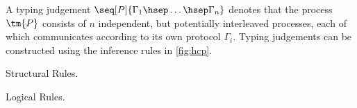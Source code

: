 \begin{definition}\label{def:hcp-typing}
  A typing judgement $\seq[P]{\Gamma_1 \hsep \dots \hsep \Gamma_n}$ denotes
  that the process $\tm{P}$ consists of $n$ independent, but potentially
  interleaved processes, each of which communicates according to its own
  protocol $\Gamma_i$. 
  Typing judgements can be constructed using the inference rules in
  \cref{fig:hcp}.
\end{definition}
\begin{figure*}[!htb]
  Structural Rules.
  \begin{center} \hcpInfAx     \hcpInfCut    \end{center}\vspace*{1\baselineskip}
  \begin{center} \hcpInfMix    \hcpInfHalt   \end{center}\vspace*{1\baselineskip}
  
  Logical Rules.
  \begin{center} \hcpInfTens   \hcpInfParr   \end{center}\vspace*{1\baselineskip}
  \begin{center} \hcpInfOne    \hcpInfBot    \end{center}\vspace*{1\baselineskip}
  \begin{center}     \end{center}\vspace*{1\baselineskip}
  \begin{center} \hcpInfWith                 \end{center}\vspace*{1\baselineskip}
  \begin{center} \hcpInfNil    \hcpInfTop    \end{center} 
  
  \caption{Hypersequent Classical Processes with \textsc{H-Mix}}
  \label{fig:hcp}
\end{figure*}
